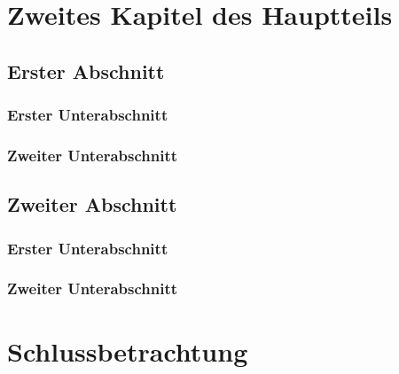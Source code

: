 \documentclass[
  11pt,
  letterpaper,
  DIV=11,
  numbers=noendperiod]{scrartcl}
\numberwithin{equation}{section} %
\begin{document}
\newpage

\section{Zweites Kapitel des Hauptteils}


\subsection{Erster Abschnitt}

\subsubsection{Erster Unterabschnitt}

\subsubsection{Zweiter Unterabschnitt}


 
\subsection{Zweiter Abschnitt}

\subsubsection{Erster Unterabschnitt}

\subsubsection{Zweiter Unterabschnitt}

\newpage



\section{Schlussbetrachtung}
\newpage

\end{document}
